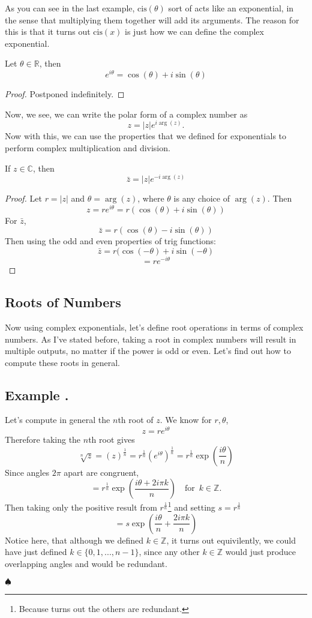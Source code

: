 \documentclass[11pt]{article}
\numberwithin{lemma}{section}
\numberwithin{equation}{section}
\numberwithin{define}{section}
\numberwithin{prop}{section}
\numberwithin{figure}{section}
\numberwithin{theorem}{section}
\numberwithin{cor}{section}
\newcounter{ex}[section]
\newenvironment{ex}[0]{

	\refstepcounter{ex}
    \subsection*{Example \theex .}
    }
    {
    \hfill$\spadesuit$
    \par
    }
\numberwithin{ex}{section}
\def\real{\mathbb{R}}
\def\complex{\mathbb{C}}
\def\integ{\mathbb{Z}}
\def\paren#1{\left(#1\right)}
\def\for{\quad\text{for }\,}
\begin{document}
 As you can see in the last example, $\text{cis}(\theta)$ sort of acts like an exponential, in the sense that multiplying them together will add its arguments. The reason for this is that it turns out $\text{cis}(x)$ is just how we can define the complex exponential.
 
 \begin{theorem}
 	Let $\theta\in\real$, then
 	$$e^{i\theta}=\cos(\theta)+i\sin(\theta)$$	
 \end{theorem}
 \begin{proof}
 	Postponed indefinitely.
 \end{proof}
 
 Now, we see, we can write the polar form of a complex number as
 $$z=|z|e^{i\arg(z)}.$$
Now with this, we can use the properties that we defined for exponentials to perform complex multiplication and division.

\begin{theorem}
	If $z\in\complex$, then 
	$$\bar{z}=|z|e^{-i\arg(z)}$$
\end{theorem}
\begin{proof}
	Let $r=|z|$ and $\theta=\arg(z)$, where $\theta$ is any choice of $\arg(z)$.
	Then
	$$z=re^{i\theta}=r(\cos(\theta)+i\sin(\theta))$$
	For $\bar{z}$,
	$$\bar{z}=r(\cos(\theta)-i\sin(\theta))$$
	Then using the odd and even properties of trig functions:
	$$\bar{z}=r(\cos(-\theta)+i\sin(-\theta)$$
	$$=re^{-i\theta}$$
\end{proof}

\subsection{Roots of Numbers}
Now using complex exponentials, let's define root operations in terms of complex numbers. As I've stated before, taking a root in complex numbers will result in multiple outputs, no matter if the power is odd or even. Let's find out how to compute these roots in general.

\begin{ex}
	Let's compute in general the $n$th root of $z$. We know for $r,\theta$,
	$$z=re^{i\theta}$$
	Therefore taking the $n$th root gives
	$$\sqrt[n]{z}=(z)^{\frac{1}{n}}=r^{\frac{1}{n}}(e^{i\theta})^\frac{1}{n}
	=r^{\frac{1}{n}}\exp\paren{\frac{i\theta}{n}}$$
	Since angles $2\pi$ apart are congruent,
	$$=r^{\frac{1}{n}}\exp\paren{\frac{i\theta+2i\pi k}{n}} \for k\in\integ.$$
	Then taking only the positive result from $r^{\frac{1}{n}}$\footnote{Because turns out the others are redundant.}
	and setting $s=r^\frac{1}{n}$
	$$=s\exp\paren{\frac{i\theta}{n}+\frac{2i\pi k}{n}}$$
	Notice here, that although we defined $k\in\integ$, it turns out equivilently, we could have just defined $k\in\{0,1,...,n-1\}$, since any other $k\in\integ$ would just produce overlapping angles and would be redundant.
\end{ex}
\end{document}
